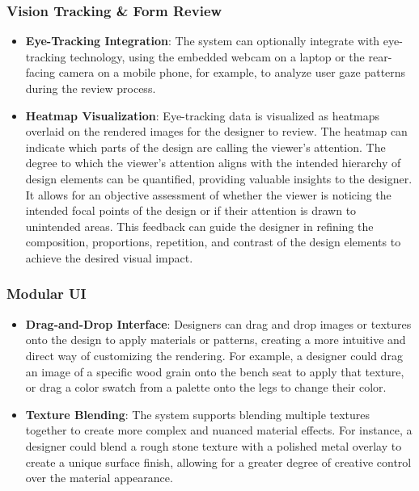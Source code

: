 \documentclass[12pt]{report}
\begin{document}
\subsubsection{Vision Tracking \& Form Review}
\begin{itemize}
\item \textbf{Eye-Tracking Integration}: The system can optionally integrate with eye-tracking technology, using the embedded webcam on a laptop or the rear-facing camera on a mobile phone, for example, to analyze user gaze patterns during the review process.
\item \textbf{Heatmap Visualization}: Eye-tracking data is visualized as heatmaps overlaid on the rendered images for the designer to review. The heatmap can indicate which parts of the design are calling the viewer's attention. The degree to which the viewer's attention aligns with the intended hierarchy of design elements can be quantified, providing valuable insights to the designer. It allows for an objective assessment of whether the viewer is noticing the intended focal points of the design or if their attention is drawn to unintended areas. This feedback can guide the designer in refining the composition, proportions, repetition, and contrast of the design elements to achieve the desired visual impact.
\end{itemize}

\subsubsection{Modular UI}
\begin{itemize}
\item \textbf{Drag-and-Drop Interface}: Designers can drag and drop images or textures onto the design to apply materials or patterns, creating a more intuitive and direct way of customizing the rendering. For example, a designer could drag an image of a specific wood grain onto the bench seat to apply that texture, or drag a color swatch from a palette onto the legs to change their color.
\item \textbf{Texture Blending}: The system supports blending multiple textures together to create more complex and nuanced material effects. For instance, a designer could blend a rough stone texture with a polished metal overlay to create a unique surface finish, allowing for a greater degree of creative control over the material appearance.
\end{itemize}
\end{document}
